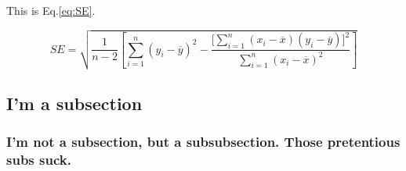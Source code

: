 
This is Eq.\eqref{eq:SE}.

\lipsum[1]
\begin{equation}
    \label{eq:SE} 
    SE=\sqrt{\frac{1}{n-2}\left[\sum^{n}_{i=1}(y_i-\overline{y})^2-\frac{\Big[\sum^{n}_{i=1}(x_i-\overline{x})(y_i-\overline{y})\Big]^2}{\sum^{n}_{i=1}(x_i-\overline{x})^2}\right]}
\end{equation}

\lipsum[2]

\subsection{I'm a subsection}
\subsubsection{I'm not a subsection, but a subsubsection. Those pretentious subs suck.}

